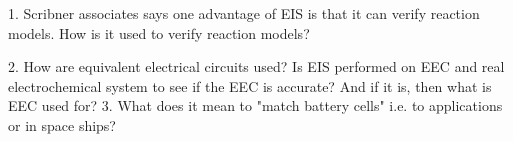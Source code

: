 1. Scribner associates says one advantage of EIS is that it can verify reaction models. How is it used to verify reaction models?

2. How are equivalent electrical circuits used?
	Is EIS performed on EEC and real electrochemical system to see if the EEC is accurate? And if it is, then what is EEC used for?
3. What does it mean to "match battery cells" i.e. to applications or in space ships?
